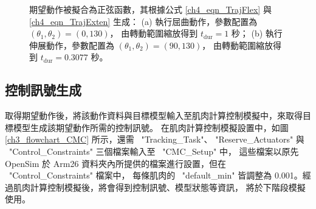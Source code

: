 \begin{figure}[!ht]
	\centering
    \caption[期望動作生成範例]{期望動作被擬合為正弦函數，其根據公式 \ref{ch4_eqn_TrajFlex} 與 \ref{ch4_eqn_TrajExten} 生成：
                             (a) 執行屈曲動作，參數配置為 $(\theta_1, \theta_2)=(0,130)$，
                             由轉動範圍縮放得到 $t_\mathrm{dur} = 1 $ 秒；
                             (b) 執行伸展動作，參數配置為 $(\theta_1, \theta_2)=(90,130)$，
                             由轉動範圍縮放得到 $t_\mathrm{dur} = 0.3077 $ 秒。}
    \label{ch4_fig_DesiredTrajExample}
\end{figure}

\subsection{控制訊號生成}
取得期望動作後，將該動作資料與目標模型輸入至肌肉計算控制模擬中，來取得目標模型生成該期望動作所需的控制訊號。
在肌肉計算控制模擬設置中，如圖 \ref{ch3_flowchart_CMC} 所示，還需 \ "Tracking\_Task"、
"Reserve\_Actuators" 與 \ "Control\_Constraints" 三個檔案輸入至 \ "CMC\_Setup" 中，
這些檔案以原先 OpenSim 於 Arm26 資料夾內所提供的檔案進行設置，但在 \ "Control\_Constraints" 檔案中，
每條肌肉的 \ "default\_min" 皆調整為 0.001。經過肌肉計算控制模擬後，將會得到控制訊號、模型狀態等資訊，
將於下階段模擬使用。

